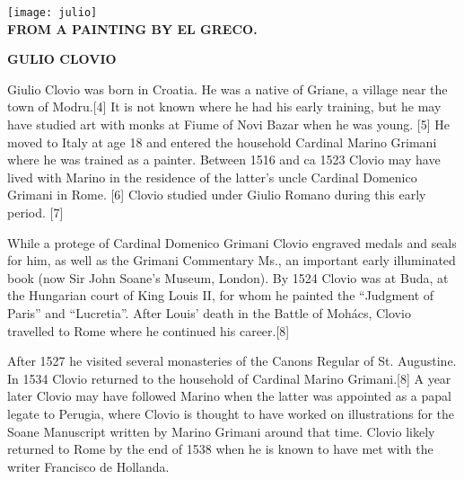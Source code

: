 \hskip-0.9cm\begin{minipage}[t]{0.9\textwidth}
\texttt{[image: julio]}\\[-17pt]
\hfill\hfill{\tiny\bf FROM A PAINTING BY EL GRECO.}\\
\par
\end{minipage}
\setlength{\columnsep}{-10pt}
\setlength{\multicolsep}{0.9cm}
\vspace*{2\baselineskip}
\begin{center}\noindent
\large\bf GULIO CLOVIO
\end{center}
\begin{multicols}{3}
Giulio Clovio was born in Croatia. He was a native of Griane, a village near the town of Modru.[4] It is not known where he had his early training, but he may have studied art with monks at Fiume of Novi Bazar when he was young. [5]
He moved to Italy at age 18 and entered the household Cardinal Marino Grimani where he was trained as a painter. Between 1516 and ca 1523 Clovio may have lived with Marino in the residence of the latter’s uncle Cardinal Domenico Grimani in Rome. [6] Clovio studied under Giulio Romano during this early period. [7]

While a protege of Cardinal Domenico Grimani Clovio engraved medals and seals for him, as well as the Grimani Commentary Ms., an important early illuminated book (now Sir John Soane's Museum, London).
By 1524 Clovio was at Buda, at the Hungarian court of King Louis II, for whom he painted the ``Judgment of Paris'' and ``Lucretia''. After Louis' death in the Battle of Mohács, Clovio travelled to Rome where he continued his career.[8]

After 1527 he visited several monasteries of the Canons Regular of St. Augustine. In 1534 Clovio returned to the household of Cardinal Marino Grimani.[8] A year later Clovio may have followed Marino when the latter was appointed as a papal legate to Perugia, where Clovio is thought to have worked on illustrations for the Soane Manuscript written by Marino Grimani around that time. Clovio likely returned to Rome by the end of 1538 when he is known to have met with the writer Francisco de Hollanda.
\end{multicols}

\clearpage

